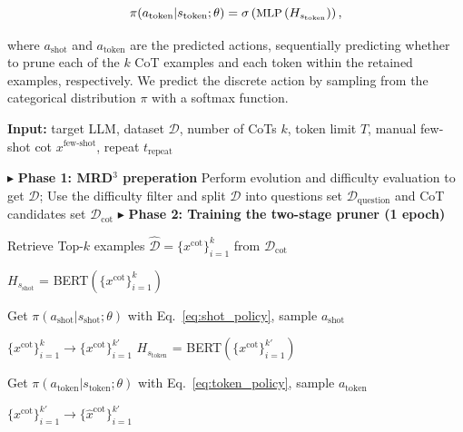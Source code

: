 \begin{equation} \label{eq:token_policy}
	\small 
	\displaystyle
\pi(a_\text{token}|s_\text{token};\theta) = \sigma\left(\text{MLP}\left(H_{s_\text{token}}\right)\right),
\end{equation}

where $a_\text{shot}$ and $a_\text{token}$ are the predicted actions, sequentially predicting whether to prune each of the $k$ CoT examples and each token within the retained examples, respectively. We predict the discrete action by sampling from the categorical distribution $\pi$ with a softmax function.

\begin{algorithm}[t]
	\small
	\caption{Pruner Training and Inference}
	\label{alg:cot-max}
	\textbf{Input:} target LLM, dataset $\mathcal{D}$,   number of CoTs $k$, token limit $T$, manual few-shot cot $x^{\text{few-shot}}$, repeat $t_{\text{repeat}}$ \\

	\begin{algorithmic}[1]

		\STATE $\blacktriangleright$ \textbf{Phase 1: MRD$^3$ preperation}
		\STATE Perform evolution and difficulty evaluation to get $\mathcal{D}$;
		\STATE Use the difficulty filter and split $\mathcal{D}$ into questions set $\mathcal{D}_{\text{question}}$ and CoT candidates set $\mathcal{D}_{\text{cot}}$
		\STATE $\blacktriangleright$ \textbf{Phase 2: Training the two-stage pruner (1 epoch)}


		\STATE Retrieve Top-$k$ examples $\hat{\mathcal{D}}=\{x^{\text{cot}}\}^k_{i=1}$ from $\mathcal{D}_{\text{cot}}$

		\STATE $H_{s_{\text{shot}}}$ = BERT$\left(\{x^{\text{cot}}\}^k_{i=1}\right)$ 


		\STATE Get $\pi\left(a_\text{shot}|s_\text{shot};\theta\right)$ with 
		Eq.~\ref{eq:shot_policy}, sample $a_\text{shot}$

		\STATE $\{x^{\text{cot}}\}^k_{i=1} \xrightarrow{}\{x^{\text{cot}}\}^{k'}_{i=1}$
		\STATE $H_{s_{\text{token}}}$ = BERT$\left(\{x^{\text{cot}}\}^{k'}_{i=1}\right)$

		\STATE Get $\pi\left(a_\text{token}|s_\text{token};\theta\right)$ with 
		Eq.~\ref{eq:token_policy}, sample $a_\text{token}$

		\STATE $\{x^{\text{cot}}\}^{k'}_{i=1}\xrightarrow{}\{\hat x^{\text{cot}}\}^{k'}_{i=1}$


\end{algorithmic}
\end{algorithm}
